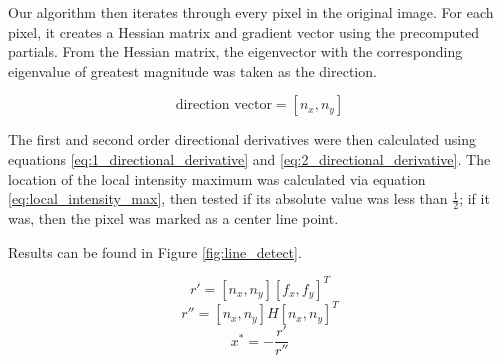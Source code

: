 \documentclass{article}
\begin{document}
Our algorithm then iterates through every pixel in the original image. For each pixel, it creates a Hessian matrix and gradient vector using the precomputed partials. From the Hessian matrix, the eigenvector with the corresponding eigenvalue of greatest magnitude was taken as the direction.

\begin{equation}
\text{direction vector} = [n_x, n_y]
\label{eq:direction}
\end{equation}

The first and second order directional derivatives were then calculated using equations \ref{eq:1_directional_derivative} and \ref{eq:2_directional_derivative}. The location of the local intensity maximum was calculated via equation \ref{eq:local_intensity_max}, then tested if its absolute value was less than $\frac{1}{2}$; if it was, then the pixel was marked as a center line point.

Results can be found in Figure \ref{fig:line_detect}.

\begin{equation}
r' = [n_x,n_y][f_x,f_y]^T
\label{eq:1_directional_derivative}
\end{equation}
\begin{equation}
r'' = [n_x,n_y]H[n_x,n_y]^T
\label{eq:2_directional_derivative}
\end{equation}
\begin{equation}
x^* = -\frac{r'}{r''}
\label{eq:local_intensity_max}
\end{equation}
\end{document}
